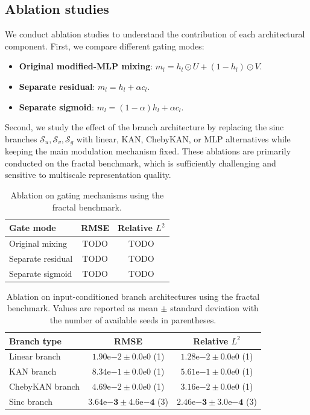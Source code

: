 \documentclass[preprint,12pt]{elsarticle}
\begin{document}
\subsection{Ablation studies}

We conduct ablation studies to understand the contribution of each architectural component. First, we compare different gating modes:
\begin{itemize}
  \item \textbf{Original modified-MLP mixing}: \(m_l=h_l\odot U+(1-h_l)\odot V\).
  \item \textbf{Separate residual}: \(m_l=h_l+\alpha c_l\).
  \item \textbf{Separate sigmoid}: \(m_l=(1-\alpha)h_l+\alpha c_l\).
\end{itemize}
Second, we study the effect of the branch architecture by replacing the sinc branches \(\mathcal{S}_u,\mathcal{S}_v,\mathcal{S}_g\) with linear, KAN, ChebyKAN, or MLP alternatives while keeping the main modulation mechanism fixed. These ablations are primarily conducted on the fractal benchmark, which is sufficiently challenging and sensitive to multiscale representation quality.

\begin{table}[t]
\centering
\caption{Ablation on gating mechanisms using the fractal benchmark.}
\label{tab:gate_ablation}
\begin{tabular}{lcc}
\toprule
Gate mode & RMSE & Relative \(L^2\) \\
\midrule
Original mixing & TODO & TODO \\
Separate residual & TODO & TODO \\
Separate sigmoid & TODO & TODO \\
\bottomrule
\end{tabular}
\end{table}

\begin{table}[t]
\centering
\caption{Ablation on input-conditioned branch architectures using the fractal benchmark. Values are reported as mean \(\pm\) standard deviation with the number of available seeds in parentheses.}
\label{tab:branch_ablation}
\begin{tabular}{lcc}
\toprule
Branch type & RMSE & Relative \(L^2\) \\
\midrule
Linear branch & \(1.90\mathrm{e}{-2}\pm0.0\mathrm{e}{0}\) (1) & \(1.28\mathrm{e}{-2}\pm0.0\mathrm{e}{0}\) (1) \\
KAN branch & \(8.34\mathrm{e}{-1}\pm0.0\mathrm{e}{0}\) (1) & \(5.61\mathrm{e}{-1}\pm0.0\mathrm{e}{0}\) (1) \\
ChebyKAN branch & \(4.69\mathrm{e}{-2}\pm0.0\mathrm{e}{0}\) (1) & \(3.16\mathrm{e}{-2}\pm0.0\mathrm{e}{0}\) (1) \\
Sinc branch & \(\mathbf{3.64\mathrm{e}{-3}\pm4.6\mathrm{e}{-4}}\) (3) & \(\mathbf{2.46\mathrm{e}{-3}\pm3.0\mathrm{e}{-4}}\) (3) \\
\bottomrule
\end{tabular}
\end{table}
\end{document}
